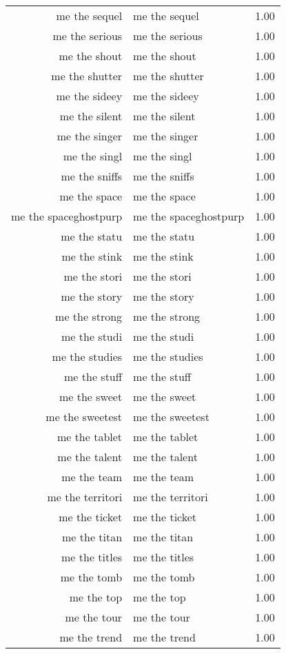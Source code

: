 \begin{table}[ht]
\begin{tabular}{rlr}
  me the sequel & me the sequel & 1.00 \\ 
  me the serious & me the serious & 1.00 \\ 
  me the shout & me the shout & 1.00 \\ 
  me the shutter & me the shutter & 1.00 \\ 
  me the sideey & me the sideey & 1.00 \\ 
  me the silent & me the silent & 1.00 \\ 
  me the singer & me the singer & 1.00 \\ 
  me the singl & me the singl & 1.00 \\ 
  me the sniffs & me the sniffs & 1.00 \\ 
  me the space & me the space & 1.00 \\ 
  me the spaceghostpurp & me the spaceghostpurp & 1.00 \\ 
  me the statu & me the statu & 1.00 \\ 
  me the stink & me the stink & 1.00 \\ 
  me the stori & me the stori & 1.00 \\ 
  me the story & me the story & 1.00 \\ 
  me the strong & me the strong & 1.00 \\ 
  me the studi & me the studi & 1.00 \\ 
  me the studies & me the studies & 1.00 \\ 
  me the stuff & me the stuff & 1.00 \\ 
  me the sweet & me the sweet & 1.00 \\ 
  me the sweetest & me the sweetest & 1.00 \\ 
  me the tablet & me the tablet & 1.00 \\ 
  me the talent & me the talent & 1.00 \\ 
  me the team & me the team & 1.00 \\ 
  me the territori & me the territori & 1.00 \\ 
  me the ticket & me the ticket & 1.00 \\ 
  me the titan & me the titan & 1.00 \\ 
  me the titles & me the titles & 1.00 \\ 
  me the tomb & me the tomb & 1.00 \\ 
  me the top & me the top & 1.00 \\ 
  me the tour & me the tour & 1.00 \\ 
  me the trend & me the trend & 1.00 \\ 

\end{tabular}
\end{table}
